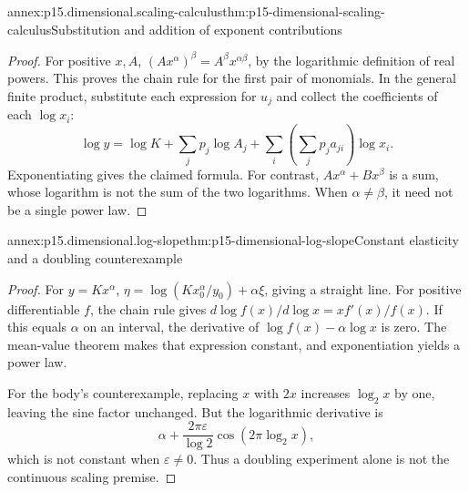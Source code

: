 \begin{annexitem}{annex:p15.dimensional.scaling-calculus}{thm:p15-dimensional-scaling-calculus}{Substitution and addition of exponent contributions}
\begin{proof}
For positive \(x,A\),
\((Ax^\alpha)^\beta=A^\beta x^{\alpha\beta}\), by the logarithmic
definition of real powers. This proves the chain rule for the first pair
of monomials. In the general finite product, substitute each expression
for \(u_j\) and collect the coefficients of each \(\log x_i\):
\[
 \log y=\log K+\sum_jp_j\log A_j+
                         \sum_i\left(\sum_jp_j a_{ji}\right)\log x_i.
\]
Exponentiating gives the claimed formula.
For contrast, \(Ax^\alpha+Bx^\beta\) is a sum, whose logarithm is
not the sum of the two logarithms. When \(\alpha\ne\beta\), it need
not be a single power law.
\end{proof}
\end{annexitem}

\begin{annexitem}{annex:p15.dimensional.log-slope}{thm:p15-dimensional-log-slope}{Constant elasticity and a doubling counterexample}
\begin{proof}
For \(y=Kx^\alpha\),
\(\eta=\log(Kx_0^\alpha/y_0)+\alpha\xi\), giving a straight line.
For positive differentiable \(f\), the chain rule gives
\(d\log f(x)/d\log x=xf'(x)/f(x)\).
If this equals \(\alpha\) on an interval, the derivative of
\(\log f(x)-\alpha\log x\) is zero. The mean-value theorem makes
that expression constant, and exponentiation yields a power law.

For the body's counterexample, replacing \(x\) with \(2x\) increases
\(\log_2x\) by one, leaving the sine factor unchanged.
But the logarithmic derivative is
\[
 \alpha+\frac{2\pi\varepsilon}{\log2}
                \cos(2\pi\log_2x),
\]
which is not constant when \(\varepsilon\ne0\).
Thus a doubling experiment alone is not the continuous scaling premise.
\end{proof}
\end{annexitem}

